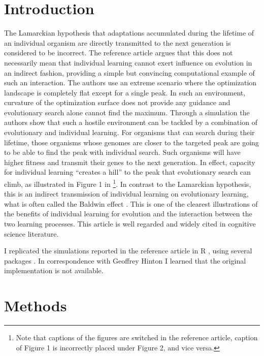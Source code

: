 \documentclass[10pt,a4paper,onecolumn]{article}
\begin{document}
\section{Introduction}\label{introduction}

The Lamarckian hypothesis that adaptations accumulated during the
lifetime of an individual organism are directly transmitted to the next
generation is considered to be incorrect. The reference article
\autocite{hinton1987learning} argues that this does not necessarily mean
that individual learning cannot exert influence on evolution in an
indirect fashion, providing a simple but convincing computational
example of such an interaction. The authors use an extreme scenario
where the optimization landscape is completely flat except for a single
peak. In such an environment, curvature of the optimization surface does
not provide any guidance and evolutionary search alone cannot find the
maximum. Through a simulation the authors show that such a hostile
environment can be tackled by a combination of evolutionary and
individual learning. For organisms that can search during their
lifetime, those organisms whose genomes are closer to the targeted peak
are going to be able to find the peak with individual search. Such
organisms will have higher fitness and transmit their genes to the next
generation. In effect, capacity for individual learning ``creates a
hill'' to the peak that evolutionary search can climb, as illustrated in
Figure 1 in \textcite{hinton1987learning}\footnote{Note that captions of
  the figures are switched in the reference article, caption of Figure 1
  is incorrectly placed under Figure 2, and vice versa.}. In contrast to
the Lamarckian hypothesis, this is an indirect transmission of
individual learning on evolutionary learning, what is often called the
Baldwin effect \autocite{Baldwin1896}. This is one of the clearest
illustrations of the benefits of individual learning for evolution and
the interaction between the two learning processes. This article is well
regarded and widely cited in cognitive science literature.

I replicated the simulations reported in the reference article
\autocite{hinton1987learning} in R \autocite{R}, using several packages
\autocites{devtools}{ggplot2}{dplyr}{reshape2}{doParallel}{foreach}{doRNG}{ggrepel}.
In correspondence with Geoffrey Hinton I learned that the original
implementation is not available.

\section{Methods}\label{methods}
\end{document}
